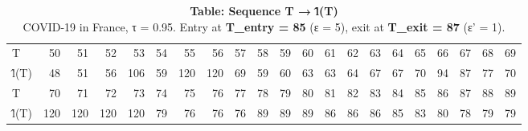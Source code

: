 \begin{table}[t]
\caption*{
{\large \textbf{Table: Sequence T → l̂(T)}} \\ 
{\small COVID-19 in France, τ = 0.95. Entry at \textbf{T\_entry = 85} (ε = 5), exit at \textbf{T\_exit = 87} (ε' = 1).}
} 
\begin{tabular*}{\linewidth}{@{\extracolsep{\fill}}lrrrrrrrrrrrrrrrrrrrr}
\toprule
 &  &  &  &  &  &  &  &  &  &  &  &  &  &  &  &  &  &  &  &  \\ 
\midrule\addlinespace[2.5pt]
T & 50 & 51 & 52 & 53 & 54 & 55 & 56 & 57 & 58 & 59 & 60 & 61 & 62 & 63 & 64 & 65 & 66 & 67 & 68 & 69 \\ 
l̂(T) & 48 & 51 & 56 & 106 & 59 & 120 & 120 & 69 & 59 & 60 & 63 & 63 & 64 & 67 & 67 & 70 & 94 & 87 & 77 & 70 \\ 
T & 70 & 71 & 72 & 73 & 74 & 75 & 76 & 77 & 78 & 79 & 80 & 81 & 82 & 83 & 84 & 85 & 86 & 87 & 88 & 89 \\ 
l̂(T) & 120 & 120 & 120 & 120 & 79 & 76 & 76 & 76 & 89 & 89 & 89 & 86 & 86 & 86 & 85 & 83 & 80 & 78 & 79 & 79 \\ 
\bottomrule
\end{tabular*}
\end{table}

